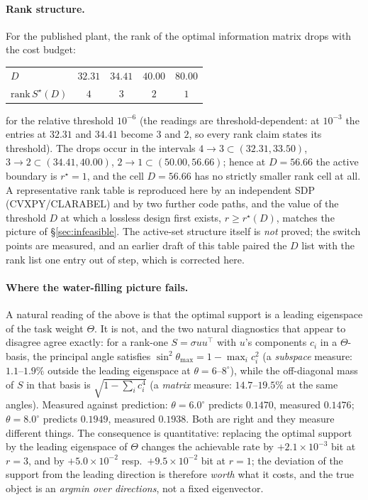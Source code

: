 \paragraph{Rank structure.} For the published plant, the rank of the optimal
information matrix drops with the cost budget:
\begin{center}\footnotesize
\begin{tabular}{lcccc}
\toprule
$D$ & $32.31$ & $34.41$ & $40.00$ & $80.00$ \\
$\mathrm{rank}\,S^{\star}(D)$ & $4$ & $3$ & $2$ & $1$ \\
\bottomrule
\end{tabular}
\end{center}
for the relative threshold $10^{-6}$ (the readings are threshold-dependent: at
$10^{-3}$ the entries at $32.31$ and $34.41$ become $3$ and $2$, so every rank
claim states its threshold). The drops occur in the intervals
$4\!\to\!3\subset(32.31,33.50)$, $3\!\to\!2\subset(34.41,40.00)$,
$2\!\to\!1\subset(50.00,56.66)$; hence at $D=56.66$ the active boundary is
$r^{\star}=1$, and the cell $D=56.66$ has no strictly smaller rank cell at all.
A representative rank table is reproduced here by an independent SDP
(CVXPY/CLARABEL) and by two further code paths, and the value of the threshold
$D$ at which a lossless design first exists, $r\ge r^{\star}(D)$, matches the
picture of \S\ref{sec:infeasible}. The active-set structure itself is \emph{not}
proved; the switch points are measured, and an earlier draft of this table paired
the $D$ list with the rank list one entry out of step, which is corrected here.

\paragraph{Where the water-filling picture fails.} A natural reading of the above
is that the optimal support is a leading eigenspace of the task weight $\Theta$.
It is not, and the two natural diagnostics that appear to disagree agree exactly:
for a rank-one $S=\sigma uu^{\top}$ with $u$'s components $c_i$ in a $\Theta$-basis,
the principal angle satisfies $\sin^2\theta_{\max}=1-\max_ic_i^2$ (a
\emph{subspace} measure: $1.1$--$1.9\%$ outside the leading eigenspace at
$\theta=6$--$8^\circ$), while the off-diagonal mass of $S$ in that basis is
$\sqrt{1-\sum_ic_i^4}$ (a \emph{matrix} measure: $14.7$--$19.5\%$ at the same
angles). Measured against prediction: $\theta=6.0^\circ$ predicts $0.1470$,
measured $0.1476$; $\theta=8.0^\circ$ predicts $0.1949$, measured $0.1938$. Both
are right and they measure different things. The consequence is quantitative:
replacing the optimal support by the leading eigenspace of $\Theta$ changes the
achievable rate by $+2.1\times10^{-3}$ bit at $r=3$, and by
$+5.0\times10^{-2}$ resp.\ $+9.5\times10^{-2}$ bit at $r=1$; the deviation of the
support from the leading direction is therefore \emph{worth} what it costs, and
the true object is an \emph{argmin over directions}, not a fixed eigenvector.

